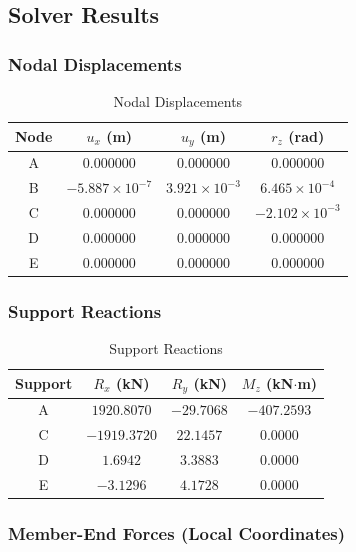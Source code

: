\subsection{Solver Results}

\subsubsection{Nodal Displacements}

\begin{table}[H]
\centering
\caption{Nodal Displacements}
\begin{tabular}{cccc}
\toprule
Node & $u_x$ (m) & $u_y$ (m) & $r_z$ (rad) \\
\midrule
A & 0.000000 & 0.000000 & 0.000000 \\
B & $-5.887\times10^{-7}$ & $3.921\times10^{-3}$ & $6.465\times10^{-4}$ \\
C & 0.000000 & 0.000000 & $-2.102\times10^{-3}$ \\
D & 0.000000 & 0.000000 & 0.000000 \\
E & 0.000000 & 0.000000 & 0.000000 \\
\bottomrule
\end{tabular}
\end{table}

\subsubsection{Support Reactions}

\begin{table}[H]
\centering
\caption{Support Reactions}
\begin{tabular}{cccc}
\toprule
Support & $R_x$ (kN) & $R_y$ (kN) & $M_z$ (kN$\cdot$m) \\
\midrule
A & $1920.8070$ & $-29.7068$ & $-407.2593$ \\
C & $-1919.3720$ & $22.1457$ & $0.0000$ \\
D & $1.6942$ & $3.3883$ & $0.0000$ \\
E & $-3.1296$ & $4.1728$ & $0.0000$ \\
\bottomrule
\end{tabular}
\end{table}

\subsubsection{Member-End Forces (Local Coordinates)}

